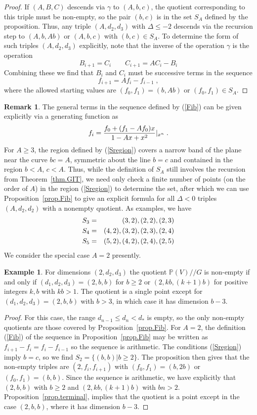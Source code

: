 \documentclass[12pt]{article}
\theoremstyle{definition}
\newtheorem{remark}[theorem]{Remark}
\newtheorem{example}[theorem]{Example}
\newcommand{\be}{\begin{equation}}
\newcommand{\ee}{\end{equation}}
\newcommand{\bea}{\begin{eqnarray}}
\newcommand{\eea}{\end{eqnarray}}
\newcommand{\GITquot}{/\!/}
\begin{document}
\begin{proof}
If $(A,B,C)$ descends via $\gamma$ to $(A,b,c)$, the quotient corresponding to this triple must be non-empty, so the pair $(b,c)$ is in the set $S_A$ defined by the proposition. Thus, any triple $(A,d_2,d_3)$ with $\Delta \le -2$ descends via the recursion step to $(A,b,Ab)$ or $(A,b,c)$ with $(b,c) \in S_A$. To determine the form of such triples $(A,d_2,d_3)$ explicitly, note that the inverse of the operation $\gamma$ is the operation
\be
B_{i+1} = C_i \qquad C_{i+1} = A C_i - B_i
\ee
Combining these we find that $B_i$ and $C_i$ must be successive terms in the sequence
\be
f_{i+1} = A f_i - f_{i-1} \; ,
\ee
where the allowed starting values are $(f_0,f_1) = (b,Ab)$ or $(f_0, f_1) \in S_A$.
\end{proof}
\begin{remark}
The general terms in the sequence defined by (\ref{Fib}) can be given explicitly via a generating function as
\be
f_i = {f_0 + (f_1 - A f_0) x \over 1 - Ax + x^2}|_{x^n} \; .
\ee
For $A \ge 3$, the region defined by (\ref{Sregion}) covers a narrow band of the plane near the curve $bc=A$, symmetric about the line $b=c$ and contained in the region $b < A$, $c < A$. Thus, while the definition of $S_A$ still involves the recursion from Theorem~\ref{thm.GIT}, we need only check a finite number of points (on the order of $A$) in the region (\ref{Sregion}) to determine the set, after which we can use Proposition~\ref{prop.Fib} to give an explicit formula for all $\Delta < 0$ triples $(A,d_2,d_2)$ with a nonempty quotient. As examples, we have
\bea
S_3 &=& {(3,2),(2,2),(2,3)} \cr
S_4 &=& {(4,2),(3,2),(2,3),(2,4)} \cr
S_5 &=& {(5,2),(4,2),(2,4),(2,5)}
\eea
We consider the special case $A=2$ presently.
\end{remark}
\begin{example}
For dimensions $(2,d_2,d_3)$ the quotient $\mathbb P(V) \GITquot  G$ is non-empty if and only if $(d_1,d_2,d_3) = (2,b,b)$ for $b \ge 2$ or $(2,kb,(k+1)b)$ for positive integers $k,b$ with $kb > 1$. The quotient is a single point except for $(d_1,d_2,d_3) = (2,b,b)$ with $b>3$, in which case it has dimension $b-3$.
\end{example}
\begin{proof}
For this case, the range $d_{n-1} \le d_n < d_*$ is empty, so the only non-empty quotients are those covered by Proposition~\ref{prop.Fib}. For $A=2$, the definition (\ref{Fib}) of the sequence in Proposition~\ref{prop.Fib} may be written as $f_{i+1} - f_{i} = f_i - f_{i-1}$ so the sequence is arithmetic. The conditions (\ref{Sregion}) imply $b=c$, so we find $S_2 = \{(b,b)|b \ge 2\}$. The proposition then gives that the non-empty triples are $(2,f_i,f_{i+1})$ with $(f_0,f_1) = (b,2b)$ or $(f_0,f_1) = (b,b)$. Since the sequence is arithmetic, we have explicitly that $(2,b,b)$ with $b \ge 2$ and $(2,kb,(k+1)b)$ with $bn > 2$. Proposition~\ref{prop.terminal}, implies that the quotient is a point except in the case $(2,b,b)$, where it has dimension $b-3$.
\end{proof}
\end{document}
